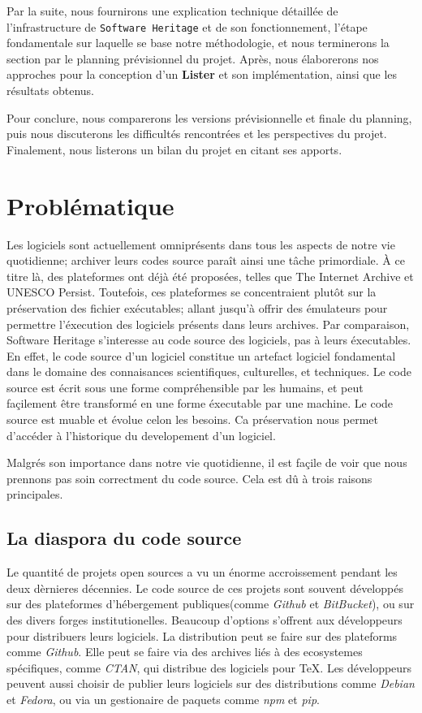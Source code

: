 \documentclass[12pt,a4paper]{report}
\theoremstyle{definition}
\begin{document}
Par la suite, nous fournirons une explication technique détaillée de l'infrastructure de \texttt{Software Heritage} et de son fonctionnement, l'étape fondamentale sur laquelle se base notre méthodologie, et nous terminerons la section par le planning prévisionnel du projet. Après, nous élaborerons nos approches pour la conception d'un \textbf{Lister} et son implémentation, ainsi que les résultats obtenus.

Pour conclure, nous comparerons les versions prévisionnelle et finale du planning, puis nous discuterons les difficultés rencontrées et les perspectives du projet. Finalement, nous listerons un bilan du projet en citant ses apports.


\chapter{Problématique}
Les logiciels sont actuellement omniprésents dans tous les aspects de notre
vie quotidienne; archiver leurs codes source paraît ainsi une tâche primordiale. À ce titre là, des plateformes ont déjà été proposées, telles que The Internet Archive
et UNESCO Persist. Toutefois, ces plateformes se concentraient plutôt sur la
préservation des fichier exécutables; allant jusqu'à offrir des émulateurs pour permettre l'éxecution des logiciels présents dans leurs archives.
Par comparaison, Software Heritage s'interesse au code source des logiciels, pas à leurs éxecutables. En effet, le code source d'un logiciel constitue un artefact logiciel fondamental dans le domaine des connaisances scientifiques, culturelles, et techniques. Le code source est écrit sous une forme compréhensible par les humains, et peut façilement être transformé en une forme éxecutable par une machine. Le code source est muable et évolue celon les besoins. Ca préservation nous permet d'accéder à l'historique du developement d'un logiciel.

Malgrés son importance dans notre vie quotidienne, il est façile de voir que nous prennons pas soin correctment du code source. Cela est dû à trois raisons principales.

\section{La diaspora du code source}
Le quantité de projets open sources a vu un énorme accroissement pendant les deux dèrnieres décennies. Le code source de ces projets sont souvent développés sur des plateformes d'hébergement publiques(comme \textit{Github} et \textit{BitBucket}), ou sur des divers forges institutionelles.
Beaucoup d'options s'offrent aux développeurs pour distribuers leurs logiciels. La distribution peut se faire sur des plateforms comme \textit{Github}. Elle peut se faire via des archives liés à des ecosystemes spécifiques, comme \textit{CTAN}, qui distribue des logiciels pour TeX. Les développeurs peuvent aussi choisir de publier leurs logiciels sur des distributions comme \textit{Debian} et \textit{Fedora}, ou via un gestionaire de paquets comme \textit{npm} et \textit{pip}.
\end{document}
